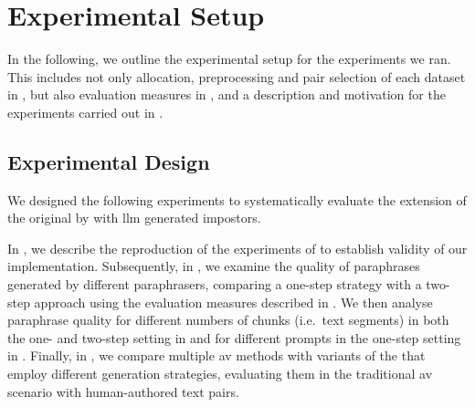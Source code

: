 \chapter{Experimental Setup}
\label{chap:experimental_setup}

In the following, we outline the experimental setup for the experiments we ran.
This includes not only allocation, preprocessing and pair selection of each dataset in , but also evaluation measures in , and a description and motivation for the experiments carried out in .






\section{Experimental Design}
\label{sec:experimental_setup}

We designed the following experiments to systematically evaluate the extension of the original \impAppr{} by \citet{koppel_determining_2014} with \ac{llm} generated impostors. 

In , we describe the reproduction of the experiments of \citet{koppel_determining_2014} to establish validity of our implementation.
Subsequently, in , we examine the quality of paraphrases generated by different paraphrasers, comparing a one-step strategy with a two-step approach using the evaluation measures described in .
We then analyse paraphrase quality for different numbers of chunks (i.e.\ text segments) in both the one- and two-step setting in  and for different prompts in the one-step setting in .
Finally, in , we compare multiple \ac{av} methods with variants of the \impAppr{} that employ different \imp{} generation strategies, evaluating them in the traditional \ac{av} scenario with human-authored text pairs.















